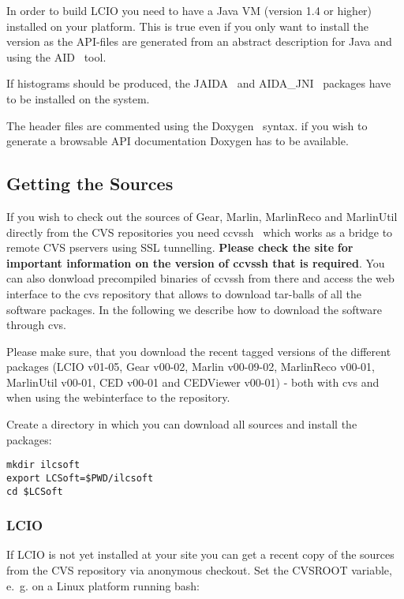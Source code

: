In order to build LCIO you need to have a Java VM (version 1.4 or
higher) installed on your platform. This is true even if you only want
to install the \CPP{} version as the API-files are generated from an
abstract description for Java and \CPP{} using the AID~\cite{ref_aid} tool.

If histograms should be produced, the JAIDA~\cite{ref_jaida} and
AIDA\_JNI~\cite{ref_aidajni} packages have
to be installed on the system.

The header files are commented using the Doxygen~\cite{ref_doxygen} syntax.
if you wish to generate a browsable API documentation Doxygen
has to be available.



\subsection{Getting the Sources}

If you wish to check out the sources of Gear, Marlin, MarlinReco
and MarlinUtil directly from the CVS repositories you need
ccvssh~\cite{ref_ccvssh} which  works as a bridge to remote CVS pservers using SSL tunnelling.
{\bf Please check the site }
{\bf for important information on the version of ccvssh that is required}.
You can also donwload precompiled binaries of ccvssh from there and access the web interface to
the cvs repository that allows to download tar-balls of all the software packages. In the
following we describe how to download the software through cvs.

Please make sure, that you download the recent tagged versions of the
different packages (LCIO v01-05, Gear v00-02, Marlin v00-09-02,
MarlinReco v00-01, MarlinUtil v00-01, CED v00-01 and CEDViewer v00-01) -
both with cvs and when using the webinterface to the repository.

Create a directory in which you can download all sources and install
the packages:

\begin{verbatim}
mkdir ilcsoft
export LCSoft=$PWD/ilcsoft
cd $LCSoft
\end{verbatim}

\subsubsection*{LCIO}

If LCIO is not yet installed at your site you can get a recent copy
of the sources from the CVS repository via anonymous checkout.
Set the CVSROOT variable, e.~g. on a Linux platform running bash:

